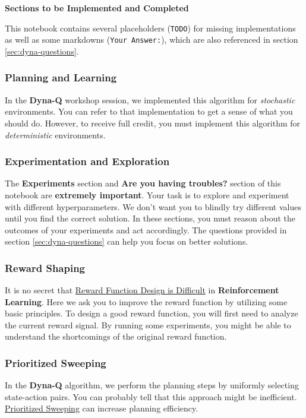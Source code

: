 \textbf{Sections to be Implemented and Completed}

This notebook contains several placeholders (\texttt{TODO}) for missing implementations as well as some markdowns (\texttt{Your Answer:}), which are also referenced in section \ref{sec:dyna-questions}.

\subsubsection{Planning and Learning} 
In the \textbf{Dyna-Q} workshop session, we implemented this algorithm for \textit{stochastic} environments. 
You can refer to that implementation to get a sense of what you should do. 
However, to receive full credit, you must implement this algorithm for \textit{deterministic} environments.

\subsubsection{Experimentation and Exploration} 
The \textbf{Experiments} section and \textbf{Are you having troubles?} section of this notebook are \textbf{extremely important}. 
Your task is to explore and experiment with different hyperparameters. 
We don't want you to blindly try different values until you find the correct solution. 
In these sections, you must reason about the outcomes of your experiments and act accordingly. 
The questions provided in section \ref{sec:dyna-questions} can help you focus on better solutions.

\subsubsection{Reward Shaping} 
It is no secret that \href{https://www.alexirpan.com/2018/02/14/rl-hard.html#reward-function-design-is-difficult}{Reward Function Design is Difficult} in \textbf{Reinforcement Learning}. 
Here we ask you to improve the reward function by utilizing some basic principles. 
To design a good reward function, you will first need to analyze the current reward signal. 
By running some experiments, you might be able to understand the shortcomings of the original reward function.

\subsubsection{Prioritized Sweeping} 
In the \textbf{Dyna-Q} algorithm, we perform the planning steps by uniformly selecting state-action pairs. 
You can probably tell that this approach might be inefficient. \href{http://incompleteideas.net/book/ebook/node98.html}{Prioritized Sweeping} can increase planning efficiency.

